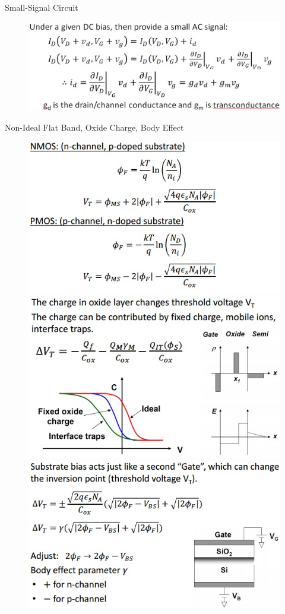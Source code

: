 \documentclass[11pt,landscape]{article}
\begin{document}
\begin{multicols}{3}
Small-Signal Circuit
\begin{figure}[H]
    \includegraphics[scale=0.53]{./Images/3/7.jpg}
\end{figure}
Non-Ideal Flat Band, Oxide Charge, Body Effect
\begin{figure}[H]
    \includegraphics[scale=0.53]{./Images/3/4.jpg}
    \includegraphics[scale=0.53]{./Images/3/5.jpg}
    \includegraphics[scale=0.53]{./Images/3/6.jpg}
\end{figure}


\end{multicols}
\end{document}
